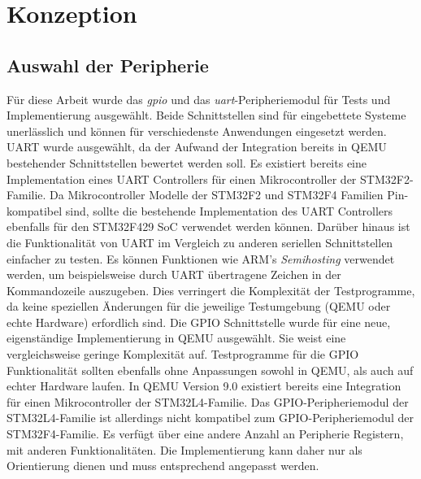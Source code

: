 

\clearpage
\chapter{Konzeption}

\section{Auswahl der Peripherie}
\label{sec:concept-periphery-selection}

Für diese Arbeit wurde das \textit{\ac{gpio}} und das
\textit{\ac{uart}}-Peripheriemodul für Tests und Implementierung ausgewählt.
Beide Schnittstellen sind für eingebettete Systeme unerlässlich und können für
verschiedenste Anwendungen eingesetzt werden.
\newline
UART wurde ausgewählt, da der Aufwand der Integration bereits in QEMU
bestehender Schnittstellen bewertet werden soll.
Es existiert bereits eine Implementation eines UART Controllers für einen
Mikrocontroller der STM32F2-Familie.
Da Mikrocontroller Modelle der STM32F2 und STM32F4 Familien Pin-kompatibel
sind, sollte die bestehende Implementation des UART Controllers ebenfalls
für den STM32F429 SoC verwendet werden können.
Darüber hinaus ist die Funktionalität von UART im Vergleich zu anderen
seriellen Schnittstellen einfacher zu testen.
Es können Funktionen wie ARM's \textit{Semihosting} verwendet werden, um
beispielsweise durch UART übertragene Zeichen in der Kommandozeile auszugeben.
Dies verringert die Komplexität der Testprogramme, da keine speziellen
Änderungen für die jeweilige Testumgebung (QEMU oder echte Hardware) erfordlich
sind.
\newline
Die GPIO Schnittstelle wurde für eine neue, eigenständige Implementierung in
QEMU ausgewählt.
Sie weist eine vergleichsweise geringe Komplexität auf.
Testprogramme für die GPIO Funktionalität sollten ebenfalls ohne Anpassungen
sowohl in QEMU, als auch auf echter Hardware laufen.
In QEMU Version 9.0 existiert bereits eine Integration für einen
Mikrocontroller der STM32L4-Familie.
Das GPIO-Peripheriemodul der STM32L4-Familie ist allerdings nicht kompatibel
zum GPIO-Peripheriemodul der STM32F4-Familie.
Es verfügt über eine andere Anzahl an Peripherie Registern, mit anderen
Funktionalitäten.
Die Implementierung kann daher nur als Orientierung dienen und muss
entsprechend angepasst werden.

